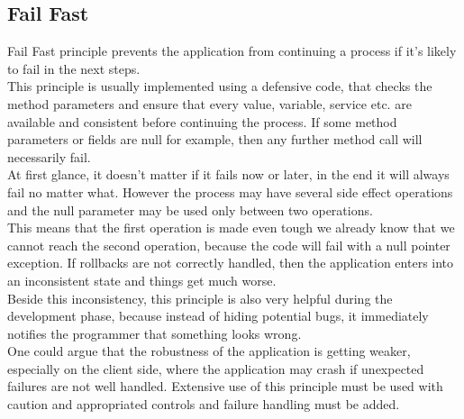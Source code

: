 \subsection{Fail Fast}\label{subsec:fail-fast}
Fail Fast principle prevents the application from continuing a process if
it's likely to fail in the next steps. \\
\newline
This principle is usually implemented using a defensive code, that checks
the method parameters and ensure that every value, variable, service etc.
are available and consistent before continuing the process.
If some method parameters or fields are null for example, then any
further method call will necessarily fail. \\
\newline
At first glance, it doesn't matter if it fails now or later, in the end
it will always fail no matter what.
However the process may have several side effect operations and the null
parameter may be used only between two operations. \\
This means that the first operation is made even tough we already know
that we cannot reach the second operation, because the code will fail
with a null pointer exception.
If rollbacks are not correctly handled, then the application enters into
an inconsistent state and things get much worse. \\
\newline
Beside this inconsistency, this principle is also very helpful during
the development phase, because instead of hiding potential bugs, it
immediately notifies the programmer that something looks wrong. \\
One could argue that the robustness of the application is getting
weaker, especially on the client side, where the application may crash
if unexpected failures are not well handled.
Extensive use of this principle must be used with caution and
appropriated controls and failure handling must be added.

